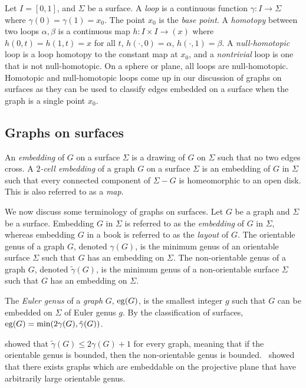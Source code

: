 Let $I = [0, 1]$, and $\Sigma$ be a surface.
A \textit{loop} is a continuous function $\gamma : I \rightarrow \Sigma$ where $\gamma(0) = \gamma(1) = x_0$. The point $x_0$ is the \textit{base point}. A \textit{homotopy} between two loops $\alpha, \beta$ is a continuous map $h : I \times I \rightarrow (x)$ where $h(0, t) = h(1, t) = x$ for all $t$, $h(\cdot, 0) = \alpha$, $h(\cdot, 1) = \beta$. A \textit{null-homotopic} loop is a loop homotopy to the constant map at $x_0$, and a \textit{nontrivial} loop is one that is not null-homotopic. On a sphere or plane, all loops are null-homotopic. Homotopic and null-homotopic loops come up in our discussion of graphs on surfaces as they can be used to classify edges embedded on a surface when the graph is a single point $x_0$. 


\subsection{Graphs on surfaces}

An \textit{embedding} of $G$ on a surface $\Sigma$ is a drawing of $G$ on $\Sigma$ such that no two edges cross. 
A \textit{$2$-cell embedding} of a graph $G$ on a surface $\Sigma$ is an embedding of $G$ in $\Sigma$ such that every connected component of $\Sigma - G$ is homeomorphic to an open disk. This is also referred to as a \textit{map}.

We now discuss some terminology of graphs on surfaces. Let $G$ be a graph and $\Sigma$ be a surface. Embedding $G$ in $\Sigma$ is referred to as the \textit{embedding} of $G$ in $\Sigma$, whereas embedding $G$ in a book is referred to as the \textit{layout} of $G$. The orientable genus of a graph \(G\), denoted \(\gamma(G)\), is the minimum genus of an orientable surface $\Sigma$ such that $G$ has an embedding on $\Sigma$. The non-orientable genus of a graph \(G\), denoted \(\tilde{\gamma}(G)\), is the minimum genus of a non-orientable surface $\Sigma$ such that $G$ has an embedding on $\Sigma$. 

The \textit{Euler genus} of a \textit{graph} \(G\), $\operatorname{eg}(G)$, is the smallest integer \(g\) such that \(G\) can be embedded on $\Sigma$ of Euler genus $g$. By the classification of surfaces, $\operatorname{eg}(G) = \min(2 \gamma(G), \tilde{\gamma}(G))$. 

\textcite{moharOrientableGenusGraphs1998} showed that \(\tilde{\gamma}(G) \leq 2 \gamma(G) + 1\) for every graph, meaning that if the orientable genus is bounded, then the non-orientable genus is bounded.\ \textcite{auslanderImbeddingGraphsManifolds1963} showed that there exists graphs which are embeddable on the projective plane that have arbitrarily large orientable genus. 

